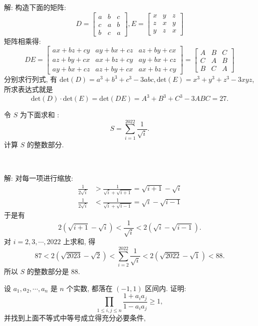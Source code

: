 解: 构造下面的矩阵:
\[
D = \begin{bmatrix}
a & b & c \\
c & a & b \\
b & c & a
\end{bmatrix}, 
E = \begin{bmatrix}
x & y & z \\
z & x & y \\
y & z & x
\end{bmatrix}
\]
矩阵相乘得:
\[
DE = \begin{bmatrix}
ax+bz+cy & ay+bx+cz & az+by+cx \\
az+by+cx & ax+bz+cy & ay+bx+cz \\
ay+bx+cz & az+by+cx & ax+bz+cy 
\end{bmatrix} = 
\begin{bmatrix}
A & B & C\\
C & A & B\\
B & C & A 
\end{bmatrix}
\]
分别求行列式, 有 $\mathrm{det}(D) = a^3 + b^3 + c^3 - 3abc, \mathrm{det}(E) = x^3+y^3+z^3-3xyz$, 所求表达式就是 
\[ \mathrm{det}(D)\cdot\mathrm{det}(E) = \mathrm{det}(DE) = A^3+B^3+C^3-3ABC = 27 . \]


\newpage

令 $S$ 为下面求和 :
\[S = \sum_{i=1}^{2022}{\frac{1}{\sqrt{i}}} .\]
计算 $S$ 的整数部分.

~

解: 对每一项进行缩放:
\begin{align*}
\frac{1}{2\sqrt{i}} &> \frac{1}{\sqrt{i}+\sqrt{i+1}} = \sqrt{i+1}-\sqrt{i} \\
\frac{1}{2\sqrt{i}} &< \frac{1}{\sqrt{i}+\sqrt{i-1}} = \sqrt{i}-\sqrt{i-1}
\end{align*}
于是有
\[2(\sqrt{i+1} - \sqrt{i}) < \frac{1}{\sqrt{i}} < 2(\sqrt{i} - \sqrt{i - 1}) .\]
对 $i=2,3,\cdots,2022$ 上求和, 得
\[87 < 2(\sqrt{2023} - \sqrt{2}) < \sum_{i=2}^{2022}{\frac{1}{\sqrt{i}}} < 2(\sqrt{2022} - \sqrt{1}) < 88 .\]
所以 $S$ 的整数部分是 88.


\newpage
设 $a_1, a_2, \cdots, a_n$ 是 $n$ 个实数, 都落在 $(-1,1)$ 区间内. 证明:
\[\prod_{1\le i,j\le n}\frac{1+a_ia_j}{1-a_ia_j} \ge 1 ,\]
并找到上面不等式中等号成立得充分必要条件,

~


